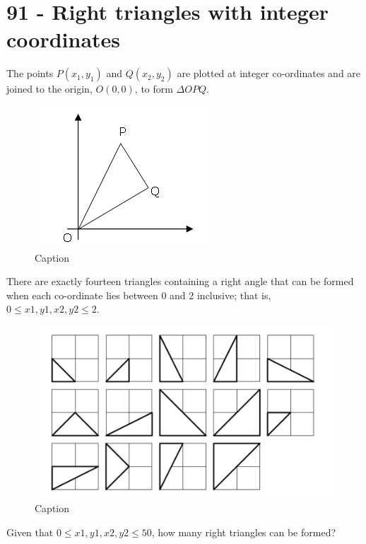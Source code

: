 \chapter*{91 - Right triangles with integer coordinates}

The points $P(x_1, y_1)$ and $Q(x_2, y_2)$ are plotted at integer co-ordinates and are joined to the origin, $O(0,0)$, to form $\Delta OPQ$.

\begin{figure}[H]
    \centering
    \includegraphics[scale=0.5]{images/pe911.png}
    \caption{Caption}
    \label{fig:my_label}
\end{figure}

There are exactly fourteen triangles containing a right angle that can be formed when each co-ordinate lies between 0 and 2 inclusive; that is, $0 \leq x1, y1, x2, y2\leq 2$.

\begin{figure}[H]
    \centering
    \includegraphics[scale=0.5]{images/pe912.png}
    \caption{Caption}
    \label{fig:my_label}
\end{figure}

Given that $0 \leq x1, y1, x2, y2 \leq 50$, how many right triangles can be formed?

